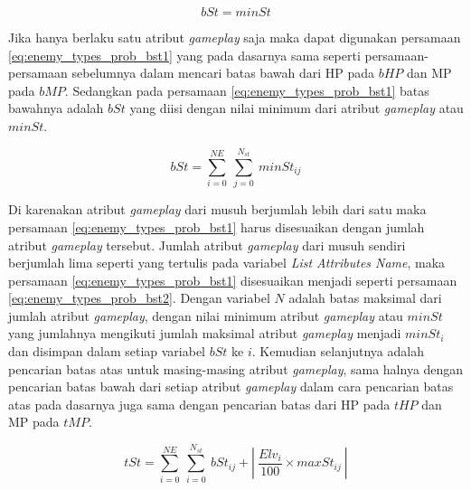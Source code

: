 \begin{equation}\label{eq:enemy_types_prob_bst1}
bSt = minSt
\end{equation}

Jika hanya berlaku satu atribut \textit{gameplay} saja maka dapat digunakan persamaan \ref{eq:enemy_types_prob_bst1} yang pada dasarnya sama seperti persamaan-persamaan sebelumnya dalam mencari batas bawah dari HP pada $bHP$ dan MP pada $bMP$. Sedangkan pada persamaan \ref{eq:enemy_types_prob_bst1} batas bawahnya adalah $bSt$ yang diisi dengan nilai minimum dari atribut \textit{gameplay} atau $minSt$.
\vspace{1ex}

\begin{equation}\label{eq:enemy_types_prob_bst2}
bSt = \sum_{i=0}^{NE}\ \sum_{j=0}^{N_{st}}\ minSt_{ij}
\end{equation}

Di karenakan atribut \textit{gameplay} dari musuh berjumlah lebih dari satu maka persamaan \ref{eq:enemy_types_prob_bst1} harus disesuaikan dengan jumlah atribut \textit{gameplay} tersebut. Jumlah atribut \textit{gameplay} dari musuh sendiri berjumlah lima seperti yang tertulis pada variabel \textit{List Attributes Name}, maka persamaan \ref{eq:enemy_types_prob_bst1} disesuaikan menjadi seperti persamaan \ref{eq:enemy_types_prob_bst2}. Dengan variabel $N$ adalah batas maksimal dari jumlah atribut \textit{gameplay}, dengan nilai minimum atribut \textit{gameplay} atau $minSt$ yang jumlahnya mengikuti jumlah maksimal atribut \textit{gameplay} menjadi $minSt_{i}$ dan disimpan dalam setiap variabel $bSt$ ke $i$. Kemudian selanjutnya adalah pencarian batas atas untuk masing-masing atribut \textit{gameplay}, sama halnya dengan pencarian batas bawah dari setiap atribut \textit{gameplay} dalam cara pencarian batas atas pada dasarnya juga sama dengan pencarian batas dari HP pada $tHP$ dan MP pada $tMP$.
\vspace{1ex}

\begin{equation}\label{eq:enemy_types_prob_tst}
tSt = \sum_{i=0}^{NE}\ \sum_{i=0}^{N_{st}}\ bSt_{ij} + \left |\ \frac{Elv_{i}}{100} \times maxSt_{ij}\ \right |
\end{equation}

